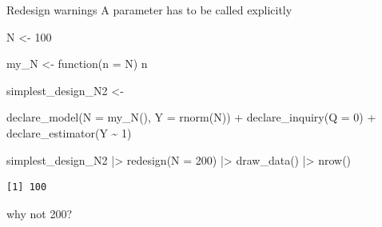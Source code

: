 \documentclass[
  11pt,
  ignorenonframetext,
]{beamer}
\newenvironment{Shaded}{\begin{snugshade}}{\end{snugshade}}
\newcommand{\AttributeTok}[1]{\textcolor[rgb]{0.40,0.45,0.13}{#1}}
\newcommand{\ControlFlowTok}[1]{\textcolor[rgb]{0.00,0.23,0.31}{#1}}
\newcommand{\DecValTok}[1]{\textcolor[rgb]{0.68,0.00,0.00}{#1}}
\newcommand{\FunctionTok}[1]{\textcolor[rgb]{0.28,0.35,0.67}{#1}}
\newcommand{\NormalTok}[1]{\textcolor[rgb]{0.00,0.23,0.31}{#1}}
\newcommand{\OtherTok}[1]{\textcolor[rgb]{0.00,0.23,0.31}{#1}}
\newcommand{\SpecialCharTok}[1]{\textcolor[rgb]{0.37,0.37,0.37}{#1}}
\begin{document}
\begin{frame}[fragile]{Redesign warnings}
\protect\hypertarget{redesign-warnings-1}{}
A parameter has to be called explicitly

\begin{Shaded}
\begin{Highlighting}[]
\NormalTok{N }\OtherTok{\textless{}{-}} \DecValTok{100}

\NormalTok{my\_N }\OtherTok{\textless{}{-}} \ControlFlowTok{function}\NormalTok{(}\AttributeTok{n =}\NormalTok{ N) n}

\NormalTok{simplest\_design\_N2 }\OtherTok{\textless{}{-}} 
  
  \FunctionTok{declare\_model}\NormalTok{(}\AttributeTok{N =} \FunctionTok{my\_N}\NormalTok{(), }\AttributeTok{Y =} \FunctionTok{rnorm}\NormalTok{(N)) }\SpecialCharTok{+}
  \FunctionTok{declare\_inquiry}\NormalTok{(}\AttributeTok{Q =} \DecValTok{0}\NormalTok{) }\SpecialCharTok{+}
  \FunctionTok{declare\_estimator}\NormalTok{(Y }\SpecialCharTok{\textasciitilde{}} \DecValTok{1}\NormalTok{)}

\NormalTok{simplest\_design\_N2 }\SpecialCharTok{|\textgreater{}} \FunctionTok{redesign}\NormalTok{(}\AttributeTok{N =} \DecValTok{200}\NormalTok{) }\SpecialCharTok{|\textgreater{}} \FunctionTok{draw\_data}\NormalTok{() }\SpecialCharTok{|\textgreater{}} \FunctionTok{nrow}\NormalTok{()}
\end{Highlighting}
\end{Shaded}

\begin{verbatim}
[1] 100
\end{verbatim}

why not 200?
\end{frame}
\end{document}
